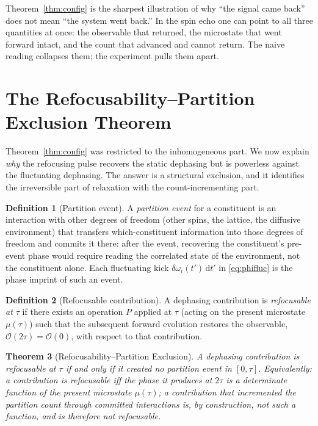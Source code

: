 \documentclass[11pt,a4paper]{article}
\theoremstyle{thmstyle}
\newtheorem{theorem}{Theorem}[section]
\theoremstyle{definition}
\newtheorem{definition}[theorem]{Definition}
\theoremstyle{remark}
\newcommand{\Obs}{\mathcal{O}}
\newcommand{\Mic}{\mu}
\begin{document}
Theorem~\ref{thm:config} is the sharpest illustration of why ``the
signal came back'' does not mean ``the system went back.'' In the spin
echo one can point to all three quantities at once: the observable that
returned, the microstate that went forward intact, and the count that
advanced and cannot return. The naive reading collapses them; the
experiment pulls them apart.

\section{The Refocusability--Partition Exclusion Theorem}
\label{sec:exclusion}

Theorem~\ref{thm:config} was restricted to the inhomogeneous part. We
now explain \emph{why} the refocusing pulse recovers the static
dephasing but is powerless against the fluctuating dephasing. The answer
is a structural exclusion, and it identifies the irreversible part of
relaxation with the count-incrementing part.

\begin{definition}[Partition event]
\label{def:partition-event}
A \emph{partition event} for a constituent is an interaction with other
degrees of freedom (other spins, the lattice, the diffusive environment)
that transfers which-constituent information into those degrees of
freedom and commits it there: after the event, recovering the
constituent's pre-event phase would require reading the correlated state
of the environment, not the constituent alone. Each fluctuating kick
$\delta\omega_{i}(t')\,\mathrm{d}t'$ in \eqref{eq:phifluc} is the phase
imprint of such an event.
\end{definition}

\begin{definition}[Refocusable contribution]
\label{def:refocusable}
A dephasing contribution is \emph{refocusable at $\tau$} if there exists
an operation $P$ applied at $\tau$ (acting on the present microstate
$\Mic(\tau)$) such that the subsequent forward evolution restores the
observable, $\Obs(2\tau)=\Obs(0)$, with respect to that contribution.
\end{definition}

\begin{theorem}[Refocusability--Partition Exclusion]
\label{thm:exclusion}
A dephasing contribution is refocusable at $\tau$ \emph{if and only if}
it created no partition event in $[0,\tau]$. Equivalently: a contribution
is refocusable iff the phase it produces at $2\tau$ is a determinate
function of the present microstate $\Mic(\tau)$; a contribution that
incremented the partition count through committed interactions is, by
construction, not such a function, and is therefore not refocusable.
\end{theorem}
\end{document}
